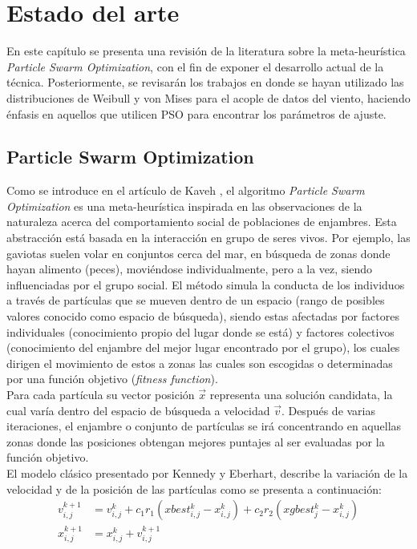
\chapter{Estado del arte}
En este capítulo se presenta una revisión de la literatura sobre la meta-heurística \emph{Particle Swarm Optimization}, con el fin de exponer el desarrollo actual de la técnica. Posteriormente, se revisarán los trabajos en donde se hayan utilizado las distribuciones de Weibull y von Mises para el acople de datos del viento, haciendo énfasis en aquellos que utilicen PSO para encontrar los parámetros de ajuste.

\section{Particle Swarm Optimization}
Como se introduce en el artículo de Kaveh \cite{Psoexplain14}, el algoritmo \emph{Particle Swarm Optimization} es una meta-heurística inspirada en las observaciones de la naturaleza acerca del comportamiento social de poblaciones de enjambres. Esta abstracción está basada en la interacción en grupo de seres vivos. Por ejemplo, las gaviotas suelen volar en conjuntos cerca del mar, en búsqueda de zonas donde hayan alimento (peces), moviéndose individualmente, pero a la vez, siendo influenciadas por el grupo social. El método simula la conducta de los individuos a través de partículas que se mueven dentro de un espacio (rango de posibles valores conocido como espacio de búsqueda), siendo estas afectadas por factores individuales (conocimiento propio del lugar donde se está) y factores colectivos (conocimiento del enjambre del mejor lugar encontrado por el grupo), los cuales dirigen el movimiento de estos a zonas las cuales son escogidas o determinadas por una función objetivo (\emph{fitness function}).\\
Para cada partícula su vector posición  $\vec{x}$ representa una solución candidata, la cual varía dentro del espacio de búsqueda a velocidad $\vec{v}$. Después de varias iteraciones, el enjambre o conjunto de partículas se irá concentrando en aquellas zonas donde las posiciones obtengan mejores puntajes al ser evaluadas por la función objetivo.
\\El modelo clásico presentado por Kennedy y Eberhart\cite{Kennedy95}, describe la variación de la velocidad y de la posición de las partículas como se presenta a continuación:
\begin{align}
    v_{i,j}^{k+1} &= v_{i,j}^{k} + c_{1}r_{1}(xbest_{i,j}^k - x_{i,j}^k) + c_{2}r_{2}(xgbest_{j}^{k} - x_{i,j}^k) \\
    x_{i,j}^{k+1} &= x_{i,j}^{k} + v_{i,j}^{k+1}
\end{align}    
